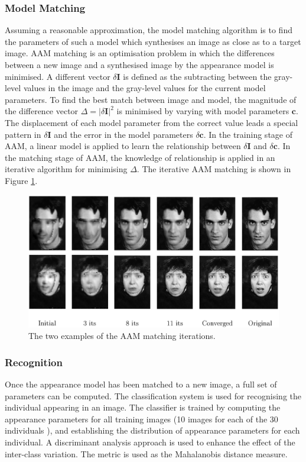 \subsubsection{Model Matching}
Assuming a reasonable approximation, the model matching algorithm is to find the parameters of such a model which synthesises an image as close as to a target image. AAM matching is an optimisation problem in which the differences between a new image and a synthesised image by the appearance model is minimised. A different vector $\delta \mathbf{I}$ is defined as the subtracting between the gray-level values in the image and the gray-level values for the current model parameters. To find the best match between image and model, the magnitude of the difference vector $\Delta=|\delta \mathbf{I}|^2$ is minimised by varying with model parameters $\mathbf{c}$. The displacement of each model parameter from the correct value leads a special pattern in  $\delta \mathbf{I}$ and the error in the model parameters  $\delta \mathbf{c}$. In the training stage of AAM, a linear model is applied to learn the relationship between $\delta \mathbf{I}$ and $\delta \mathbf{c}$. In the matching stage of AAM, the knowledge of relationship is applied in an iterative algorithm for minimising $\Delta$. The iterative AAM matching is shown in \mbox{Figure} \ref{fig:AAMmatching}.
\begin{figure}[ht]
 \begin{center}
  \includegraphics[width=\columnwidth]{ch2/figures/AAMmatching.jpg}
\caption{The two examples of the AAM matching iterations. \cite{Cootes2001}}
\label{fig:AAMmatching}
 \end{center}
\end{figure} 

\subsubsection{Recognition}
Once the appearance model has been matched to a new image, a full set of parameters can be computed. The classification system is used for recognising the individual appearing in an image. The classifier is trained by computing the appearance parameters for all training images (10 images for each of the 30 individuals \cite{Lanitis1997}), and establishing the distribution of appearance parameters for each individual. A discriminant analysis approach is used to enhance the effect of the inter-class variation. The metric is used as the Mahalanobis distance measure.

